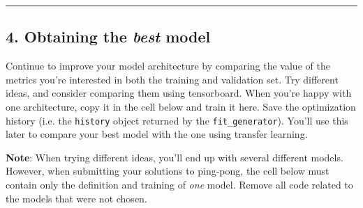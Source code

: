 \documentclass[11pt]{article}
\begin{document}
    \begin{center}\rule{0.5\linewidth}{\linethickness}\end{center}

\subsection{\texorpdfstring{4. Obtaining the \emph{best}
model}{4. Obtaining the best model}}\label{obtaining-the-best-model}

    Continue to improve your model architecture by comparing the value of
the metrics you're interested in both the training and validation set.
Try different ideas, and consider comparing them using tensorboard. When
you're happy with one architecture, copy it in the cell below and train
it here. Save the optimization history (i.e. the \texttt{history} object
returned by the \texttt{fit\_generator}). You'll use this later to
compare your best model with the one using transfer learning.

\textbf{Note}: When trying different ideas, you'll end up with several
different models. However, when submitting your solutions to ping-pong,
the cell below must contain only the definition and training of
\emph{one} model. Remove all code related to the models that were not
chosen.
\end{document}
